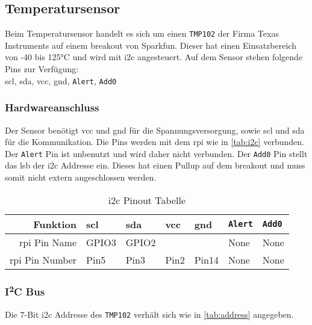 \subsection{Temperatursensor}

Beim Temperatursensor handelt es sich um einen \texttt{TMP102} der Firma Texas Instruments auf einem \gls{breakout} von Sparkfun.
Dieser hat einen Einsatzbereich von -40 bis 125°C und wird mit \gls{i2c} angesteuert.
Auf dem Sensor stehen folgende Pins zur Verfügung: \\
\gls{scl}, \gls{sda}, \gls{vcc}, \gls{gnd}, \texttt{Alert}, \texttt{Add0}

\subsubsection{Hardwareanschluss}

Der Sensor benötigt \gls{vcc} und \gls{gnd} für die Spannungsversorgung, sowie \gls{scl} und \gls{sda} für die Kommunikation.
Die Pins werden mit dem \gls{rpi} wie in \autoref{tab:i2c} verbunden.
Der \texttt{Alert} Pin ist unbenutzt und wird daher nicht verbunden.
Der \texttt{Add0} Pin stellt das \gls{lsb} der \gls{i2c} Addresse ein.
Dieses hat einen Pullup auf dem \gls{breakout} und muss somit nicht extern angeschlossen werden.

\begin{table}
    \centering
    \begin{tabular}{|r||l|l|l|l|l|l|}
        \hline
        \textbf{Funktion} & \textbf{\gls{scl}} & \textbf{\gls{sda}} & \textbf{\gls{vcc}} & \textbf{\gls{gnd}} & \textbf{\texttt{Alert}} & \textbf{\texttt{Add0}}\\
        \hline
        \hline
        \gls{rpi} Pin Name & GPIO3 & GPIO2 & & & None & None \\
        \hline
        \gls{rpi} Pin Number & Pin5 & Pin3 & Pin2 & Pin14 & None & None \\
        \hline
    \end{tabular}
    \caption{\gls{i2c} Pinout Tabelle}
    \label{tab:i2c}
\end{table}

\subsubsection{I\textsuperscript{2}C Bus}

Die $7$-Bit \gls{i2c} Addresse des \texttt{TMP102} verhält sich wie in \autoref{tab:address} angegeben.

